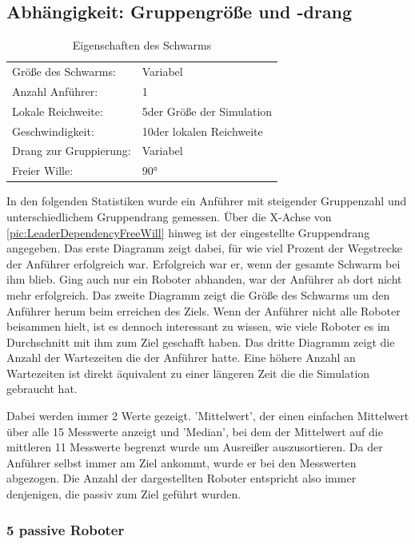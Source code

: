 \subsection*{Abhängigkeit: Gruppengröße und -drang}

\begin{table}[h]
	\caption{Eigenschaften des Schwarms}
	\begin{tabular}{ll}
		Größe des Schwarms:		& Variabel \\
		Anzahl Anführer:		& 1 \\
		Lokale Reichweite:		& 5\per der Größe der Simulation \\
		Geschwindigkeit:		& 10\per der lokalen Reichweite \\
		Drang zur Gruppierung:	& Variabel \\
		Freier Wille:			& 90° \\
	\end{tabular}
\end{table}

In den folgenden Statistiken wurde ein Anführer mit steigender Gruppenzahl und unterschiedlichem Gruppendrang gemessen. Über die X-Achse von \autoref{pic:LeaderDependencyFreeWill} hinweg ist der eingestellte Gruppendrang angegeben.
Das erste Diagramm zeigt dabei, für wie viel Prozent der Wegstrecke der Anführer erfolgreich war. Erfolgreich war er, wenn der gesamte Schwarm bei ihm blieb. Ging auch nur ein Roboter abhanden, war der Anführer ab dort nicht mehr erfolgreich.
Das zweite Diagramm zeigt die Größe des Schwarms um den Anführer herum beim erreichen des Ziels. Wenn der Anführer nicht alle Roboter beisammen hielt, ist es dennoch interessant zu wissen, wie viele Roboter es im Durchschnitt mit ihm zum Ziel geschafft haben.
Das dritte Diagramm zeigt die Anzahl der Wartezeiten die der Anführer hatte. Eine höhere Anzahl an Wartezeiten ist direkt äquivalent zu einer längeren Zeit die die Simulation gebraucht hat.

Dabei werden immer 2 Werte gezeigt. 'Mittelwert', der einen einfachen Mittelwert über alle 15 Messwerte anzeigt und 'Median', bei dem der Mittelwert auf die mittleren 11 Messwerte begrenzt wurde um Ausreißer auszusortieren. Da der Anführer selbst immer am Ziel ankommt, wurde er bei den Messwerten abgezogen. Die Anzahl der dargestellten Roboter entspricht also immer denjenigen, die passiv zum Ziel geführt wurden.

\newpage\subsubsection*{5 passive Roboter}


